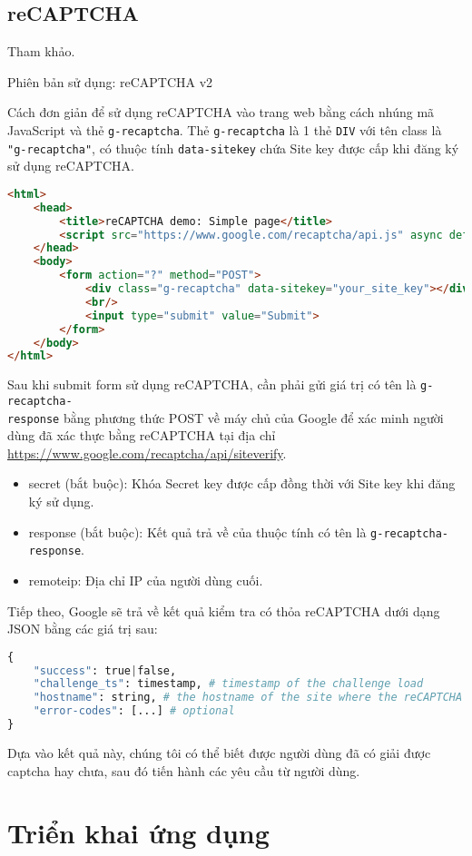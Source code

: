 \subsection{reCAPTCHA}
Tham khảo\cite{captcha}.
\par
Phiên bản sử dụng: reCAPTCHA v2
\par
Cách đơn giản để sử dụng reCAPTCHA vào trang web bằng cách nhúng mã JavaScript và thẻ \texttt{g-recaptcha}. Thẻ \texttt{g-recaptcha} là 1 thẻ \texttt{DIV} với tên class là \texttt{"g-recaptcha"}, có thuộc tính \texttt{data-sitekey} chứa Site key được cấp khi đăng ký sử dụng reCAPTCHA.
\begin{lstlisting}[language=HTML]
<html>
	<head>
		<title>reCAPTCHA demo: Simple page</title>
		<script src="https://www.google.com/recaptcha/api.js" async defer></script>
	</head>
	<body>
		<form action="?" method="POST">
			<div class="g-recaptcha" data-sitekey="your_site_key"></div>
			<br/>
			<input type="submit" value="Submit">
		</form>
	</body>
</html>
\end{lstlisting}
\par
Sau khi submit form sử dụng reCAPTCHA, cần phải gửi giá trị có tên là \texttt{g-recaptcha-\\response} bằng phương thức POST về máy chủ của Google để xác minh người dùng đã xác thực bằng reCAPTCHA tại địa chỉ \url{https://www.google.com/recaptcha/api/siteverify}.
\begin{itemize}
	\item secret (bắt buộc): Khóa Secret key được cấp đồng thời với Site key khi đăng ký sử dụng.
	\item response (bắt buộc): Kết quả trả về của thuộc tính có tên là \texttt{g-recaptcha-response}.
	\item remoteip: Địa chỉ IP của người dùng cuối.
\end{itemize}
\par
Tiếp theo, Google sẽ trả về kết quả kiểm tra có thỏa reCAPTCHA dưới dạng JSON bằng các giá trị sau:
\begin{lstlisting}[language=Python]
{
	"success": true|false,
	"challenge_ts": timestamp, # timestamp of the challenge load
	"hostname": string, # the hostname of the site where the reCAPTCHA was solved
	"error-codes": [...] # optional
}
\end{lstlisting}
\par
Dựa vào kết quả này, chúng tôi có thể biết được người dùng đã có giải được captcha hay chưa, sau đó tiến hành các yêu cầu từ người dùng.	
\section{Triển khai ứng dụng}
